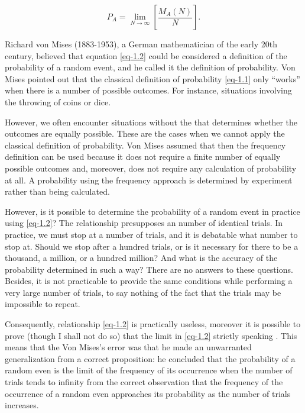 \begin{equation}
P_{A} = \lim_{N \rightarrow \infty}  \left[ \frac{M_{A} (N)}{N}
\right].
\label{eq-1.2}
\end{equation}

Richard von Mises (1883-1953), a German mathematician of the early
20th century, believed that equation \eqref{eq-1.2} could be considered
a definition of the probability of a random event, and he called it
the  definition of probability. Von Mises pointed out
that the classical definition of probability \eqref{eq-1.1}
only ``works'' when there is a  number of 
possible outcomes. For instance, situations involving the throwing of
coins or dice.


However, we often encounter situations without the 
that determines whether the outcomes are equally possible. These are
the cases when we cannot apply the classical definition of
probability. Von Mises assumed that then the frequency definition can
be used because it does not require a finite number of equally
possible outcomes and, moreover, does not require any calculation of
probability at all.  A probability using the frequency approach is
determined by experiment rather than being calculated.


However, is it possible to determine the probability of a random event
in practice using \eqref{eq-1.2}? The relationship
presupposes an  number of identical trials. In
practice, we must stop at a  number of trials, and it is
debatable what number to stop at. Should we stop after a hundred
trials, or is it necessary for there to be a thousand, a million, or a
hundred million? And what is the accuracy of the probability
determined in such a way? There are no answers to these questions.
Bcsides, it is not practicable to provide the same conditions while
performing a very large number of trials, to say nothing of the fact
that the trials may be impossible to repeat.


Consequently, relationship \eqref{eq-1.2} is practically
useless, moreover it is possible to prove (though I shall not do so)
that the limit in \eqref{eq-1.2}  strictly
speaking . This means that the Von Mises's error was that
he made an unwarranted generalization from a correct proposition: he
concluded that the probability of a random even is the limit of the
frequency of its occurrence when the  number of trials tends to
infinity from the correct observation that the frequency of the
occurrence of a random even approaches its probability as the number
of trials increases. 

